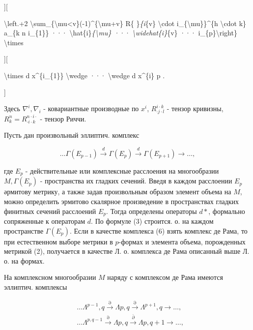 \documentclass[10pt]{article}
\begin{document}
][



\textbackslash left.+2 \textbackslash sum\_\{\textbackslash mu<v\}(-1)\^{}\{\textbackslash mu+v\} R\{ \}\textit{\{i}\{v\} \textbackslash cdot i\_\{\textbackslash mu\}\}\^{}\{h \textbackslash cdot k\} a\_\{k n i\_\{1\}\} ··· \textbackslash hat\{i\}\textit{\{\textbackslash mu\} ··· \textbackslash widehat\{i\}}\{v\} ··· i\_\{p\}\textbackslash right\} \textbackslash times



][



\textbackslash times d x\^{}\{i\_\{1\}\} \textbackslash wedge ··· \textbackslash wedge d x\^{}\{i\} p .

]



Здесь $\nabla^{i}, \nabla_{i}$ - ковариантные производные по $x^{i}$, $R_{\cdot j \cdot l}^{i \cdot k}$ - тензор кривизны, $R_{k}^{n}=R_{\cdot i \cdot k}^{n \cdot i \cdot}$ - тензор Риччи.



Пусть дан произвольный эллиптич. комплекс



\[

\ldots \Gamma\left(E_{p-1}\right) \stackrel{d}{\longrightarrow} \Gamma\left(E_{p}\right) \stackrel{d}{\longrightarrow} \Gamma\left(E_{p+1}\right) \longrightarrow \ldots,

\]



где $E_{p}$ - действительные или комплексные расслоения на многообразии $M, \Gamma\left(E_{p}\right)$ - пространства их гладких сечений. Введя в каждом расслоении $E_{p}$ әрмитову метрику, а также задав произвольным образом элемент объема на $M$, можно определить эрмитово скалярное произведение в пространствах гладких финитных сечений расслоений $E_{p}$. Тогда определены операторы $d *$, формально сопряженные к операторам $d$. По формуле (3) строится. о. на каждом пространстве $\Gamma\left(E_{p}\right)$. Если в качестве комплекса (6) взять комплекс де Рама, то при естественном выборе метрики в $p$-формах и элемента объема, порожденных метрикой (2), получается в качестве Л. о. комплекса де Рама описанный выше Л. о. на формах.



На комплексном многообразии $M$ наряду с комплексом де Рама имеются эллиптич. комплексы



\[

\begin{aligned}

& \ldots \Lambda^{p-1}, q \stackrel{\partial}{\longrightarrow} \Lambda p, q \stackrel{\partial}{\longrightarrow} \Lambda^{p+1}, q \longrightarrow \ldots, \\

& \ldots \Lambda^{p, q-1} \stackrel{\partial}{\longrightarrow} \Lambda p, q \stackrel{\bar{\partial}}{\longrightarrow} \Lambda p, q+1 \longrightarrow \ldots,

\end{aligned}

\]
\end{document}
